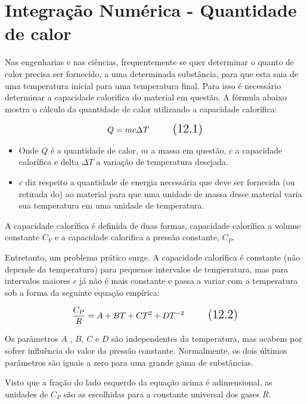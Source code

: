 \section{Integração Numérica - Quantidade de calor}

Nas engenharias e nas ciências, frequentemente se quer determinar o quanto de calor precisa ser fornecido, a uma determinada substância, para que esta saia de uma temperatura inicial para uma temperatura final. Para isso é necessário determinar a capacidade calorifica do material em questão. A fórmula abaixo mostra o cálculo da quantidade de calor utilizando a capacidade calorífica:

\begin{equation}
\Large Q = mc \Delta T
\tag{12.1}
\end{equation}

\begin{itemize}
\item Onde $Q$ é a quantidade de calor, $m$ a massa em questão,  $c$ a capacidade calorífica e delta $\Delta T$ a variação de temperatura desejada.
\item $c$ diz respeito a quantidade de energia necessária que deve ser fornecida (ou retirada do) ao material para que uma unidade de massa desse material varia sua temperatura em uma unidade de temperatura.
\end{itemize}

A capacidade calorífica é definida de duas formas, capacidade calorífica a volume constante $C_{V}$ e a capacidade calorifica a pressão constante, $C_{P}$.

Entretanto, um problema prático surge. A capacidade calorífica é constante (não depende da temperatura) para pequenos intervalos de temperatura, mas para intervalos maiores $c$ já não é mais constante e passa a variar com a temperatura sob a forma da seguinte equação empírica:

\begin{equation}
\Large \frac{C_{P}}{R} = A + BT + CT^2+DT^{-2}
\tag{12.2}
\end{equation}

Os parâmetros $A$ , $B$, $C$ e $D$ são independentes da temperatura, mas acabem por sofrer influência do valor da pressão constante. Normalmente, os dois últimos parâmetros são iguais a zero para uma grande gama de substâncias.

Visto que a fração do lado esquerdo da equação acima é adimensional, as unidades de  $C_{P}$ são as escolhidas para a constante universal dos gases $R$.

